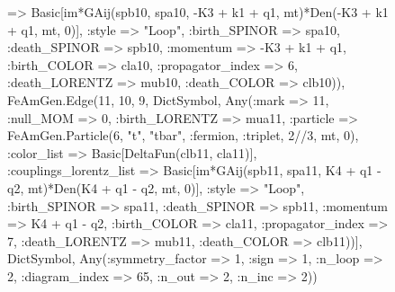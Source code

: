 \documentclass{revtex4}
\begin{document}
\begin{figure}[!htb]
\begin{center}
{=> Basic[im*GAij(spb10, spa10, -K3 + k1 + q1, mt)*Den(-K3 + k1 + q1, mt, 0)], :style => "Loop", :birth_SPINOR => spa10, :death_SPINOR => spb10, :momentum => -K3 + k1 + q1, :birth_COLOR => cla10, :propagator_index => 6, :death_LORENTZ => mub10, :death_COLOR => clb10)), FeAmGen.Edge(11, 10, 9, Dict{Symbol, Any}(:mark => 11, :null_MOM => 0, :birth_LORENTZ => mua11, :particle => FeAmGen.Particle(6, "t", "tbar", :fermion, :triplet, 2//3, mt, 0), :color_list => Basic[DeltaFun(clb11, cla11)], :couplings_lorentz_list => Basic[im*GAij(spb11, spa11, K4 + q1 - q2, mt)*Den(K4 + q1 - q2, mt, 0)], :style => "Loop", :birth_SPINOR => spa11, :death_SPINOR => spb11, :momentum => K4 + q1 - q2, :birth_COLOR => cla11, :propagator_index => 7, :death_LORENTZ => mub11, :death_COLOR => clb11))], Dict{Symbol, Any}(:symmetry_factor => 1, :sign => 1, :n_loop => 2, :diagram_index => 65, :n_out => 2, :n_inc => 2)) 
}
\end{center}
\end{figure}
\end{document}

